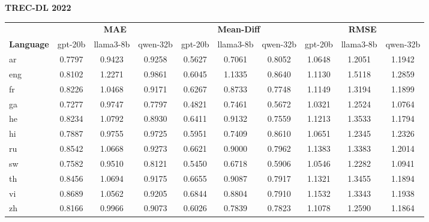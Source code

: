 \begin{table}[t]
\textbf{TREC-DL 2022} \\
\vspace{0.2em}
\begin{tabular}{lccccccccc}
\toprule
 & \multicolumn{3}{c}{\textbf{MAE}} & \multicolumn{3}{c}{\textbf{Mean-Diff}} & \multicolumn{3}{c}{\textbf{RMSE}} \\
\cmidrule(lr){2-4} \cmidrule(lr){5-7} \cmidrule(lr){8-10}
\textbf{Language} & gpt-20b & llama3-8b & qwen-32b & gpt-20b & llama3-8b & qwen-32b & gpt-20b & llama3-8b & qwen-32b \\
\midrule
ar & 0.7797 & 0.9423 & 0.9258 & 0.5627 & 0.7061 & 0.8052 & 1.0648 & 1.2051 & 1.1942 \\
eng & 0.8102 & 1.2271 & 0.9861 & 0.6045 & 1.1335 & 0.8640 & 1.1130 & 1.5118 & 1.2859 \\
fr & 0.8226 & 1.0468 & 0.9171 & 0.6267 & 0.8733 & 0.7748 & 1.1149 & 1.3194 & 1.1899 \\
ga & 0.7277 & 0.9747 & 0.7797 & 0.4821 & 0.7461 & 0.5672 & 1.0321 & 1.2524 & 1.0764 \\
he & 0.8234 & 1.0792 & 0.8930 & 0.6411 & 0.9132 & 0.7559 & 1.1213 & 1.3533 & 1.1794 \\
hi & 0.7887 & 0.9755 & 0.9725 & 0.5951 & 0.7409 & 0.8610 & 1.0651 & 1.2345 & 1.2326 \\
ru & 0.8542 & 1.0668 & 0.9273 & 0.6621 & 0.9000 & 0.7962 & 1.1383 & 1.3383 & 1.2014 \\
sw & 0.7582 & 0.9510 & 0.8121 & 0.5450 & 0.6718 & 0.5906 & 1.0546 & 1.2282 & 1.0941 \\
th & 0.8456 & 1.0694 & 0.9175 & 0.6655 & 0.9087 & 0.7917 & 1.1321 & 1.3455 & 1.1894 \\
vi & 0.8689 & 1.0562 & 0.9205 & 0.6844 & 0.8804 & 0.7910 & 1.1532 & 1.3343 & 1.1938 \\
zh & 0.8166 & 0.9966 & 0.9073 & 0.6026 & 0.7839 & 0.7823 & 1.1078 & 1.2590 & 1.1864 \\
\bottomrule
\end{tabular}
\end{table}